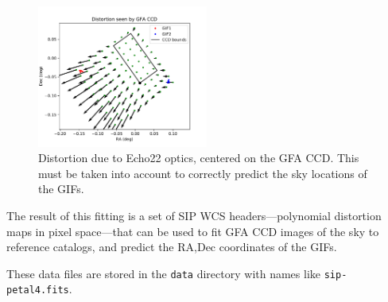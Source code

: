 \documentclass[10pt]{article}
\newcommand{\code}[1]{\texttt{#1}}
\begin{document}
\begin{figure}
  \begin{center}
    \includegraphics[width=0.5\textwidth]{distortion}
  \end{center}
  \caption{Distortion due to Echo22 optics, centered on the GFA CCD.
    This must be taken into account to correctly predict the sky
    locations of the GIFs.\label{fig:sip}}
\end{figure}

The result of this fitting is a set of SIP WCS headers---polynomial
distortion maps in pixel space---that can be used to fit GFA CCD
images of the sky to reference catalogs, and predict the RA,Dec
coordinates of the GIFs.

These data files are stored in the \code{data} directory with names like
\code{sip-petal4.fits}.
\end{document}
